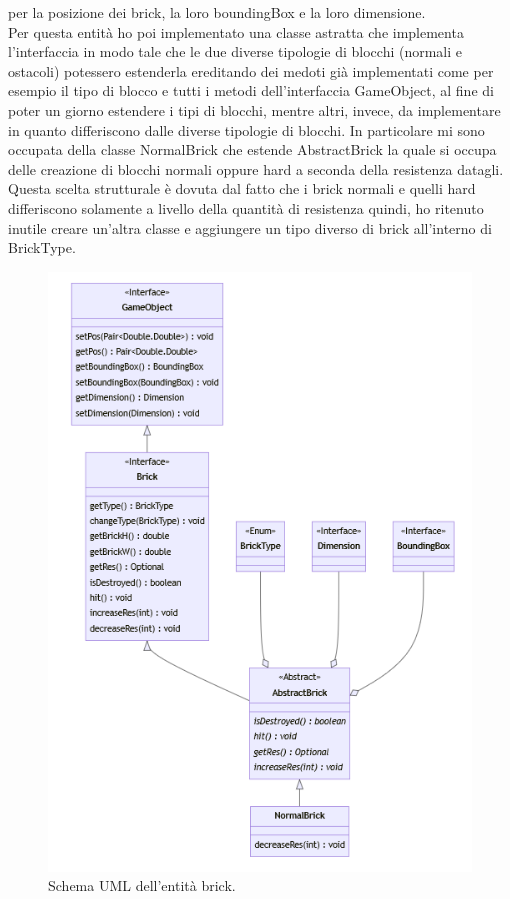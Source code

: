 \documentclass[a4paper,12pt]{report}
\begin{document}
per la posizione dei brick, la loro boundingBox e la loro dimensione.
\\Per questa entità ho poi implementato una classe astratta che implementa l'interfaccia in modo tale che le due diverse tipologie di blocchi (normali e ostacoli) potessero estenderla ereditando dei medoti
già implementati come per esempio il tipo di blocco e tutti i metodi dell'interfaccia GameObject, al fine di poter un giorno estendere i tipi di blocchi, mentre altri, invece, da implementare in quanto differiscono dalle diverse tipologie di blocchi.
In particolare mi sono occupata della classe NormalBrick che estende AbstractBrick la quale si occupa delle creazione di blocchi normali oppure hard a seconda della resistenza datagli.
\\Questa scelta strutturale è dovuta dal fatto che i brick normali e quelli hard differiscono solamente a livello della quantità di resistenza quindi, ho ritenuto inutile creare un'altra classe e
aggiungere un tipo diverso di brick all'interno di BrickType.
\begin{figure}[H]
    \centering{}
    \includegraphics[scale=0.6]{images/Brick.png}
    \caption{Schema UML dell'entità brick.}
    \label{images:Brick}
\end{figure}
\end{document}
